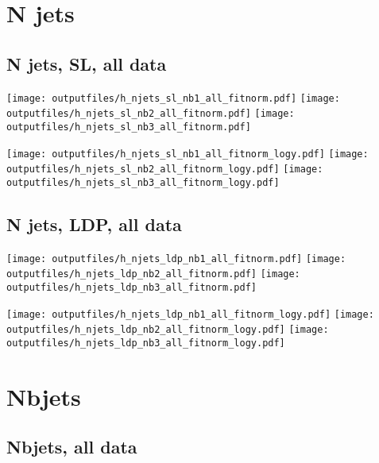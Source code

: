 \documentclass[11pt]{article}
\begin{document}
  \clearpage
   \section{ N jets }

    \subsection{ N jets, SL, all data}

    \noindent
     \texttt{[image: outputfiles/h\_njets\_sl\_nb1\_all\_fitnorm.pdf]}
     \texttt{[image: outputfiles/h\_njets\_sl\_nb2\_all\_fitnorm.pdf]}
     \texttt{[image: outputfiles/h\_njets\_sl\_nb3\_all\_fitnorm.pdf]}

    \noindent
     \texttt{[image: outputfiles/h\_njets\_sl\_nb1\_all\_fitnorm\_logy.pdf]}
     \texttt{[image: outputfiles/h\_njets\_sl\_nb2\_all\_fitnorm\_logy.pdf]}
     \texttt{[image: outputfiles/h\_njets\_sl\_nb3\_all\_fitnorm\_logy.pdf]}

   \clearpage

    \subsection{ N jets, LDP, all data}

    \noindent
     \texttt{[image: outputfiles/h\_njets\_ldp\_nb1\_all\_fitnorm.pdf]}
     \texttt{[image: outputfiles/h\_njets\_ldp\_nb2\_all\_fitnorm.pdf]}
     \texttt{[image: outputfiles/h\_njets\_ldp\_nb3\_all\_fitnorm.pdf]}

    \noindent
     \texttt{[image: outputfiles/h\_njets\_ldp\_nb1\_all\_fitnorm\_logy.pdf]}
     \texttt{[image: outputfiles/h\_njets\_ldp\_nb2\_all\_fitnorm\_logy.pdf]}
     \texttt{[image: outputfiles/h\_njets\_ldp\_nb3\_all\_fitnorm\_logy.pdf]}

   \clearpage




    \clearpage
    \section{Nbjets}

    \subsection{ Nbjets, all data}
\end{document}
